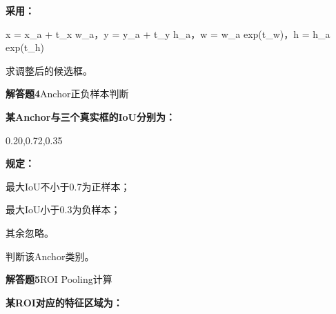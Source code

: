 \documentclass[UTF8,openany,oneside,zihao=-4,fontset=windows]{ctexbook}
\newif\ifshowsolutions
\newcommand{\Question}[2]{%
  \par\Needspace{4\baselineskip}\medskip
  \noindent\textbf{\color{MVBlue}#1}\quad #2\par
}
\newenvironment{AnswerBox}{\begin{tcolorbox}[breakable,colback=MVLight,colframe=MVBlue!45,title={参考答案},fonttitle=\bfseries,boxrule=0.55pt,arc=1.5mm,left=2mm,right=2mm,top=1.5mm,bottom=1.5mm]}{\end{tcolorbox}}
\newcommand{\PracticeSpace}[1]{\ifshowsolutions\else\par\vspace{#1}\par\fi}
\begin{document}
\par\noindent\textbf{采用：}
\begin{center}\small\ttfamily x = x\_a + t\_x w\_a，y = y\_a + t\_y h\_a，w = w\_a exp(t\_w)，h = h\_a exp(t\_h)\end{center}
\par 求调整后的候选框。
\ifshowsolutions
\begin{AnswerBox}
\par\noindent\textbf{中心横坐标：}
\par x=40+0.2×20=44
\par\noindent\textbf{中心纵坐标：}
\par y=50−0.1×10=49
\par\noindent\textbf{宽度：}
\begin{center}\small\ttfamily w = 20 exp(ln 1.5) = 20×1.5 = 30\end{center}
\par\noindent\textbf{高度：}
\begin{center}\small\ttfamily h = 10 exp(ln 2) = 10×2 = 20\end{center}
\par\noindent\textbf{所以：}
\par (x,y,w,h)=(44,49,30,20)
\end{AnswerBox}
\else
\PracticeSpace{4.2cm}
\fi
\Question{解答题4}{Anchor正负样本判断}
\par\noindent\textbf{某Anchor与三个真实框的IoU分别为：}
\par 0.20,0.72,0.35
\par\noindent\textbf{规定：}
\par\noindent\textbullet\quad 最大IoU不小于0.7为正样本；
\par\noindent\textbullet\quad 最大IoU小于0.3为负样本；
\par 其余忽略。
\par 判断该Anchor类别。
\ifshowsolutions
\begin{AnswerBox}
\par\noindent\textbf{该Anchor的最大IoU为：}
\par max(0.20,0.72,0.35)=0.72
\par\noindent\textbf{因为：}
\par 0.72≥0.7
\par 所以该Anchor为正样本。
\par 正Anchor
\end{AnswerBox}
\else
\PracticeSpace{4.2cm}
\fi
\Question{解答题5}{ROI Pooling计算}
\par\noindent\textbf{某ROI对应的特征区域为：}
\end{document}
